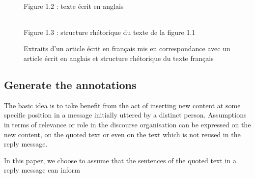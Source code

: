\begin{figure}
\begin{multicols}{2}
\begin{rhetoricaltext}
\end{rhetoricaltext}
\\Figure 1.2 :  texte écrit en anglais
\end{multicols}
\begin{center}
\\Figure 1.3 :  structure rhétorique du texte de la figure 1.1
\end{center}
\caption{Extraits d'un article écrit en français mis en correspondance avec un article écrit en anglais et structure rhétorique du texte français}
\label{ExtraitsMisEnCorrespondance}
\end{figure}
\subsection{Generate the annotations}
\label{}

The basic idea is to take benefit from the act of inserting new content at some specific position in a message initially uttered by a distinct person.
Assumptions in terms of relevance or role in the discourse organisation can be expressed on the new content, on the quoted text or even on the text which is not reused in the reply message.

In this paper, we choose to assume that the sentences of the quoted text in a reply message can inform

